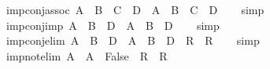 \begin{isabellebody}
\endisatagproof
{\isafoldproof}%
%
\isadelimproof
\isanewline
%
\endisadelimproof
\isanewline
{}\isamarkupfalse%
\isanewline
\isanewline
\isanewline
{}\isamarkupfalse%
\ imp{\isacharunderscore}{\kern0pt}conj{\isacharunderscore}{\kern0pt}assoc{\isacharcolon}{\kern0pt}\ {\isachardoublequoteopen}{\isacharparenleft}{\kern0pt}A\ {\isasymand}\ B{\isacharparenright}{\kern0pt}\ {\isasymand}\ C\ {\isasymlongrightarrow}\ D\ {\isasymLongrightarrow}\ A\ {\isasymand}\ {\isacharparenleft}{\kern0pt}B\ {\isasymand}\ C{\isacharparenright}{\kern0pt}\ {\isasymlongrightarrow}\ D{\isachardoublequoteclose}\isanewline
%
\isadelimproof
\ \ %
\endisadelimproof
%
\isatagproof
{}\isamarkupfalse%
\ simp%
\endisatagproof
{\isafoldproof}%
%
\isadelimproof
\isanewline
%
\endisadelimproof
\isanewline
{}\isamarkupfalse%
\ imp{\isacharunderscore}{\kern0pt}conj{\isacharunderscore}{\kern0pt}imp{\isacharcolon}{\kern0pt}\ {\isachardoublequoteopen}{\isacharparenleft}{\kern0pt}A\ {\isasymand}\ B{\isacharparenright}{\kern0pt}\ {\isasymlongrightarrow}\ D\ {\isasymLongrightarrow}\ A\ {\isasymlongrightarrow}\ {\isacharparenleft}{\kern0pt}B\ {\isasymlongrightarrow}\ D{\isacharparenright}{\kern0pt}{\isachardoublequoteclose}\isanewline
%
\isadelimproof
\ \ %
\endisadelimproof
%
\isatagproof
{}\isamarkupfalse%
\ simp%
\endisatagproof
{\isafoldproof}%
%
\isadelimproof
\isanewline
%
\endisadelimproof
\isanewline
{}\isamarkupfalse%
\ imp{\isacharunderscore}{\kern0pt}conj{\isacharunderscore}{\kern0pt}elim{\isacharcolon}{\kern0pt}\ {\isachardoublequoteopen}A\ {\isasymand}\ B\ {\isasymlongrightarrow}\ D\ {\isasymLongrightarrow}\ A\ {\isasymLongrightarrow}\ {\isacharparenleft}{\kern0pt}{\isacharparenleft}{\kern0pt}B\ {\isasymlongrightarrow}\ D{\isacharparenright}{\kern0pt}\ {\isasymLongrightarrow}\ R{\isacharparenright}{\kern0pt}\ {\isasymLongrightarrow}\ R{\isachardoublequoteclose}\isanewline
%
\isadelimproof
\ \ %
\endisadelimproof
%
\isatagproof
{}\isamarkupfalse%
\ simp%
\endisatagproof
{\isafoldproof}%
%
\isadelimproof
\isanewline
%
\endisadelimproof
\isanewline
{}\isamarkupfalse%
\ imp{\isacharunderscore}{\kern0pt}not{\isacharunderscore}{\kern0pt}elim{\isacharcolon}{\kern0pt}\ {\isachardoublequoteopen}{\isasymnot}A\ {\isasymLongrightarrow}\ A\ {\isasymLongrightarrow}\ {\isacharparenleft}{\kern0pt}False\ {\isasymLongrightarrow}\ R{\isacharparenright}{\kern0pt}\ {\isasymLongrightarrow}\ R{\isachardoublequoteclose}\isanewline
%
\isadelimproof
\ \ %
\endisadelimproof

\end{isabellebody}
